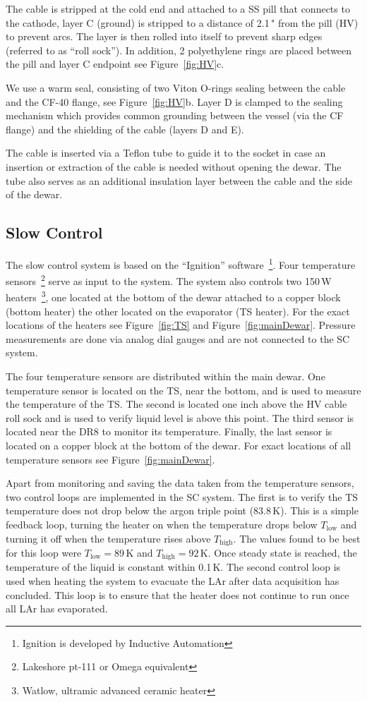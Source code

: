 \documentclass[a4paper,12pt]{article}
\newcommand{\DR}{DR8}
\newcommand{\quotes}[1]{``{#1}''}
\begin{document}
The cable is stripped at the cold end and attached to a SS pill that connects to the cathode, layer C (ground) is stripped to a distance of 2.1\," from the pill (HV) to prevent arcs. The layer is then rolled into itself to prevent sharp edges (referred to as ``roll sock''). In addition, 2 polyethylene rings are placed between the pill and layer C endpoint see Figure~\ref{fig:HV}c. 

We use a warm seal, consisting of two Viton O-rings sealing between the cable and the CF-40 flange, see Figure~\ref{fig:HV}b. Layer D is clamped to the sealing mechanism which provides common grounding between the vessel (via the CF flange) and the shielding of the cable (layers D and E).

The cable is inserted via a Teflon tube to guide it to the socket in case an insertion or extraction of the cable is needed without opening the dewar. The tube also serves as an additional insulation layer between the cable and the side of the dewar. 



\subsection{Slow Control}
\label{sec:SC}
The slow control system is based on the \quotes{Ignition} software~\footnote{Ignition is developed by Inductive Automation}. Four temperature sensors~\footnote{Lakeshore pt-111 or Omega equivalent} serve as input to the system. The system also controls two 150\,W heaters~\footnote{Watlow, ultramic advanced ceramic heater }, one located at the bottom of the dewar attached to a copper block (bottom heater) the other located on the evaporator (TS heater). For the exact locations of the heaters see Figure~\ref{fig:TS} and Figure~\ref{fig:mainDewar}. Pressure measurements are done via analog dial gauges and are not connected to the SC system.

The four temperature sensors are distributed within the main dewar. One temperature sensor is located on the TS, near the bottom, and is used to measure the temperature of the TS. The second is located one inch above the HV cable roll sock and is used to verify liquid level is above this point. The third sensor is located near the {\DR} to monitor its temperature. Finally, the last sensor is located on a copper block at the bottom of the dewar. For exact locations of all temperature sensors see Figure~\ref{fig:mainDewar}. 

Apart from monitoring and saving the data taken from the temperature sensors, two control loops are implemented in the SC system. The first is to verify the TS temperature does not drop below the argon triple point (83.8\,K). This is a simple feedback loop, turning the heater on when the temperature drops below $T_{\mathrm{low}}$ and turning it off when the temperature rises above $T_{\mathrm{high}}$. The values found to be best for this loop were $T_{\mathrm{low}} = 89$\,K and $T_{\mathrm{high}}=92$\,K.  Once steady state is reached, the temperature of the liquid is constant within 0.1\,K. The second control loop is used when heating the system to evacuate the LAr after data acquisition has concluded. This loop is to ensure that the heater does not continue to run once all LAr has evaporated. 
 
\end{document}
